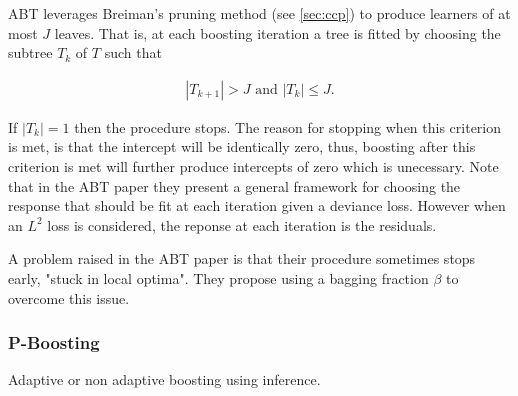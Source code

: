 \documentclass{article}
\theoremstyle{definition} \newtheorem{definition}[theorem]{Definition}
\theoremstyle{remark} \newtheorem{remark}[theorem]{Remark}
\begin{document}
ABT leverages Breiman's pruning method (see \ref{sec:ccp}) to produce learners
of at most $ J $ leaves. That is, at each boosting iteration a tree is fitted by
choosing the subtree $ T_k $ of $ T $ such that 

\begin{align*}
  \label{eq:abtrule} 
  |T_{k+1}| > J \textrm{ and } |T_{k}| \leq J.
\end{align*}

If $ |T_k| = 1$ then the procedure stops. The reason for stopping when this
criterion is met, is that the intercept will be identically zero, thus, boosting
after this criterion is met will further produce intercepts of zero which is
unecessary. Note that in the ABT paper they present a general framework for
choosing the response that should be fit at each iteration given a deviance
loss. However when an $ L^2 $ loss is considered, the reponse at each iteration
is the residuals.

A problem raised in the ABT paper is that their procedure sometimes stops early,
"stuck in local optima". They propose using a bagging fraction $ \beta $ to
overcome this issue.

\subsubsection{P-Boosting}
Adaptive or non adaptive boosting using inference.



\end{document}
